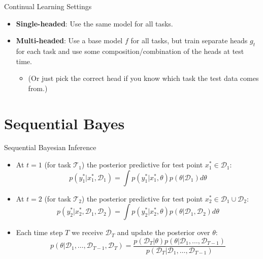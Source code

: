 \documentclass[12pt,aspectratio=169, handout]{beamer}
\let\olditem\item
\renewcommand\item{\olditem\justifying}
\begin{document}
\begin{frame}{Continual Learning Settings}

 \begin{itemize}[<+->]
     \item \textbf{Single-headed}: Use the same model for all tasks.
     \item \textbf{Multi-headed}: Use a base model $f$ for all tasks, but train separate heads $g_t$ for each task and use some composition/combination of the heads at test time.
     \pause 
     \begin{itemize}
         \item (Or just pick the correct head if you know which task the test data comes from.)
     \end{itemize}
 \end{itemize}

\end{frame}

\section{Sequential Bayes}
\begin{frame}{Sequential Bayesian Inference} 
    \vspace{1em}
    \begin{itemize}[<+->]
        \item At $t=1$ (for task $\mathcal{T}_1$) the posterior predictive for test point $x_1^* \in \mathcal{D}_1$:
        $$p(y_1^* | x_1^*, \mathcal{D}_1) = \int p(y_1^* | x_1^*, \theta)p(\theta | \mathcal{D}_1)d\theta$$
        \item At $t=2$ (for task $\mathcal{T}_2$) the posterior predictive for test point $x_2^* \in \mathcal{D}_1 \cup \mathcal{D}_2$:
        $$p(y_2^* | x_2^*, \mathcal{D}_1, \mathcal{D}_2) = \int p(y_2^* | x_2^*, \theta)p(\theta | \mathcal{D}_1, \mathcal{D}_2)d\theta$$
        \item Each time step $T$ we receive $\mathcal{D}_T$ and update the posterior over $\theta$:
        $$p(\theta|\mathcal{D}_1,\ldots,\mathcal{D}_{T-1},\mathcal{D}_T) = \frac{p(\mathcal{D}_T | \theta)p(\theta|\mathcal{D}_1,\ldots,\mathcal{D}_{T-1})}{p(\mathcal{D}_T|\mathcal{D}_1,\ldots,\mathcal{D}_{T-1})}$$
    \end{itemize}

    

\end{frame}
\end{document}
